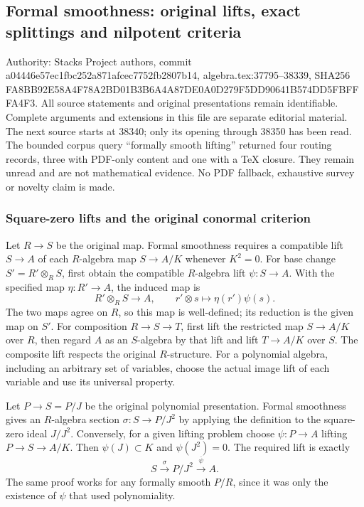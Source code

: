 \subsection{Formal smoothness: original lifts, exact splittings and nilpotent criteria}\label{algebra-proof-048-formal-smoothness-original-lifts-exact-splittings-and-nilpotent-criteria}

Authority: Stacks Project authors, commit a04446e57ec1fbc252a871afcec7752fb2807b14, algebra.tex:37795--38339, SHA256 FA8BB92E58A4F78A2BD01B3B6A4A87DE0A0D279F5DD90641B574DD5FBFFFA4F3. All source statements and original presentations remain identifiable. Complete arguments and extensions in this file are separate editorial material. The next source starts at 38340; only its opening through 38350 has been read. The bounded corpus query ``formally smooth lifting'' returned four routing records, three with PDF-only content and one with a TeX closure. They remain unread and are not mathematical evidence. No PDF fallback, exhaustive survey or novelty claim is made.

\subsubsection{Square-zero lifts and the original conormal criterion}\label{algebra-proof-048-square-zero-lifts-and-the-original-conormal-criterion}

Let \(R\to S\) be the original map. Formal smoothness requires a compatible lift \(S\to A\) of each \(R\)-algebra map \(S\to A/K\) whenever \(K^2=0\). For base change \(S'=R'\otimes_RS\), first obtain the compatible \(R\)-algebra lift \(\psi:S\to A\). With the specified map \(\eta:R'\to A\), the induced map is \[
R'\otimes_RS\longrightarrow A,\qquad r'\otimes s\longmapsto\eta(r')\psi(s).
\] The two maps agree on \(R\), so this map is well-defined; its reduction is the given map on \(S'\). For composition \(R\to S\to T\), first lift the restricted map \(S\to A/K\) over \(R\), then regard \(A\) as an \(S\)-algebra by that lift and lift \(T\to A/K\) over \(S\). The composite lift respects the original \(R\)-structure. For a polynomial algebra, including an arbitrary set of variables, choose the actual image lift of each variable and use its universal property.

Let \(P\to S=P/J\) be the original polynomial presentation. Formal smoothness gives an \(R\)-algebra section \(\sigma:S\to P/J^2\) by applying the definition to the square-zero ideal \(J/J^2\). Conversely, for a given lifting problem choose \(\psi:P\to A\) lifting \(P\to S\to A/K\). Then \(\psi(J)\subset K\) and \(\psi(J^2)=0\). The required lift is exactly \[
S\xrightarrow{\sigma}P/J^2\xrightarrow{\overline\psi}A.
\] The same proof works for any formally smooth \(P/R\), since it was only the existence of \(\psi\) that used polynomiality.

